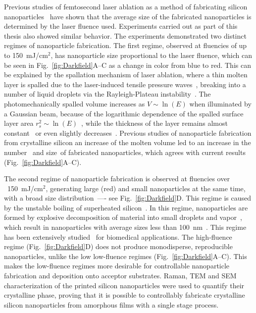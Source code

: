                 Previous studies of femtosecond laser ablation as a method of fabricating silicon nanoparticles~\cite{zywietz2014laser, zywietz2014generation}
            have shown that the average size of the fabricated nanoparticles is determined by the laser fluence used. Experiments carried
            out as part of this thesis also showed similar behavior. The experiments demonstrated two distinct regimes of nanoparticle
            fabrication. The first regime, observed at fluencies of up to 150~mJ/cm$^{2}$, has nanoparticle size proportional to the laser
            fluence, which can be seen in Fig.~\ref{fig:Darkfield}A--C as a change in color from blue to red. This can be explained by the
            spallation mechanism of laser ablation, where a thin molten layer is spalled due to the laser-induced tensile pressure waves~\cite{ionin2013thermal,wu2014microscopic},
            breaking into a number of liquid droplets via the Rayleigh-Plateau instability~\cite{papageorgiou1995breakup}.
            The photomechanically spalled volume increases as $V\sim\ln(E)$ when illuminated by a Gaussian beam, because of the
            logarithmic dependence of the spalled surface layer area $r^{2}_{s}\sim\ln(E)$~\cite{bauerle2013laser}, while
            the thickness of the layer remains almost constant~\cite{ionin2013thermal} or even slightly decreases~\cite{wu2014microscopic}.
            Previous studies of nanoparticle fabrication from crystalline silicon an increase of the molten volume led
            to an increase in the number~\cite{zywietz2014generation} and size~\cite{zywietz2014laser}of fabricated nanoparticles,
            which agrees with current results (Fig.~\ref{fig:Darkfield}A--C).

                The second regime of nanoparticle fabrication is observed at fluencies over ~150~mJ/cm$^{2}$, generating large (red) and
            small nanoparticles at the same time, with a broad size distribution~---- see Fig.~\ref{fig:Darkfield}D. This regime is caused
            by the unstable boiling of superheated silicon~\cite{bulgakova2001pulsed, ionin2013thermal, wu2014microscopic}. In this regime,
            nanoparticles are formed by explosive decomposition of material into small droplets and vapor~\cite{itina2009molecular,wu2014microscopic},
            which result in nanoparticles with average sizes less than 100~nm~\cite{amoruso2004generation}. This regime has been extensively
            studied~\cite{amoruso2004generation, tull2006formation} for biomedical applications. The high-fluence regime (Fig.~\ref{fig:Darkfield}D)
            does not produce monodisperse, reproducible nanoparticles, unlike the low low-fluence regimes (Fig.~\ref{fig:Darkfield}A--C). This
            makes the low-fluence regimes more desirable for controllable nanoparticle fabrication and deposition onto acceptor substrates.
            Raman, TEM and SEM characterization of the printed silicon nanoparticles were used to quantify their crystalline phase,
            proving that it is possible to controllably fabricate crystalline silicon nanoparticles from amorphous films with a single stage
            process.

